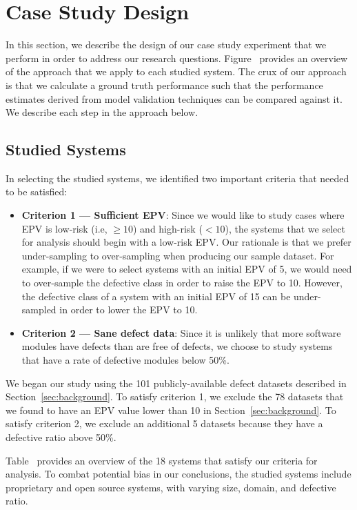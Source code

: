 
\section{Case Study Design}\label{sec:design}

In this section, we describe the design of our case study experiment that we perform in order to address our research questions.
Figure~ provides an overview of the approach that we apply to each studied system.
The crux of our approach is that we calculate a ground truth performance such that the performance estimates derived from model validation techniques can be compared against it.
We describe each step in the approach below.

\subsection{Studied Systems}

In selecting the studied systems, we identified two important criteria that needed to be satisfied:

\begin{itemize}
\item \textbf{Criterion 1 --- Sufficient EPV}:
  Since we would like to study cases where EPV is low-risk (i.e, $\ge 10$) and high-risk ($< 10$), the systems that we select for analysis should begin with a low-risk EPV.
  Our rationale is that we prefer under-sampling to over-sampling when producing our sample dataset.
  For example, if we were to select systems with an initial EPV of 5, we would need to over-sample the defective class in order to raise the EPV to 10.
  However, the defective class of a system with an initial EPV of 15 can be under-sampled in order to lower the EPV to 10.

\item \textbf{Criterion 2 --- Sane defect data}:
  Since it is unlikely that more software modules have defects than are free of defects, we choose to study systems that have a rate of defective modules below 50\%.

\end{itemize}

We began our study using the 101 publicly-available defect datasets described in Section~\ref{sec:background}. 
To satisfy criterion 1, we exclude the 78 datasets that we found to have an EPV value lower than 10 in Section~\ref{sec:background}.
To satisfy criterion 2, we exclude an additional 5 datasets because they have a defective ratio above 50\%.

Table~ provides an overview of the 18 systems that satisfy our criteria for analysis.
To combat potential bias in our conclusions, the studied systems include proprietary and open source systems, with varying size, domain, and defective ratio.

